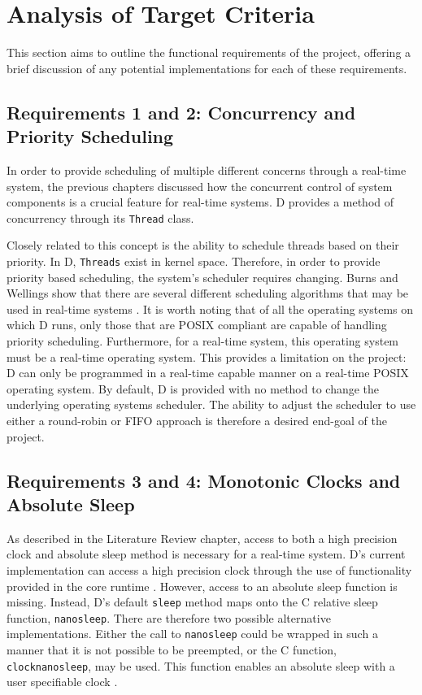 \section{Analysis of Target Criteria} 
This section aims to outline the functional requirements of the project,
offering a brief discussion of any potential implementations for each of these 
requirements. 

\subsection{Requirements 1 and 2: Concurrency and Priority Scheduling} %
In order to provide scheduling of multiple different concerns through a
real-time system, the previous chapters discussed how the concurrent control of
system components is a crucial feature for real-time systems. D provides a
method of concurrency through its \texttt{Thread} class. 
\par\bigskip\noindent
Closely related to this concept is the ability to schedule threads based on
their priority. In D, \texttt{Threads} exist in kernel space. Therefore, in order to
provide priority based scheduling, the system's scheduler requires changing. Burns
and Wellings show that there are several different scheduling algorithms that
may be used in real-time systems \cite{real-time-systems}. It is worth noting
that of all the operating systems on which D runs, only those that are POSIX
compliant are capable of handling priority scheduling. Furthermore, for a
real-time system, this operating system must be a real-time operating system.
This provides a limitation on the project: D can only be programmed in a real-time
capable manner on a real-time POSIX operating system. 
By default, D is provided with no method to change the underlying operating
systems scheduler. 
The ability to adjust the scheduler to use either a round-robin or FIFO approach 
is therefore a desired end-goal of the project.

\subsection{Requirements 3 and 4: Monotonic Clocks and Absolute Sleep} 
As described in the Literature Review chapter, access to both a high precision
clock and absolute sleep method is necessary for a real-time system. D's
current implementation can access a high precision clock through the use of
functionality provided in the core runtime \cite{dlang-core-time}. However,
access to an absolute sleep function is missing. Instead, D's default
\texttt{sleep}
method maps onto the C relative sleep function, \texttt{nanosleep}. There are
therefore two possible alternative implementations. Either the call to
\texttt{nanosleep} could be wrapped in such a manner that it is not possible to be preempted, 
or the C function, \texttt{clock\textunderscore{}nanosleep}, may be used. This function enables 
an absolute sleep with a user specifiable clock \cite{clock-nanosleep}. 

